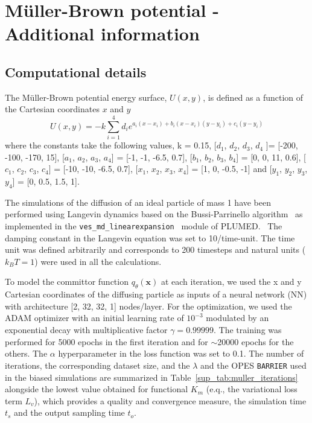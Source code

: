 \clearpage
\section{M\"uller-Brown potential - Additional information}
    \subsection{Computational details}
            The M\"uller-Brown potential energy surface, $U(x, y)$, is defined as a function of the Cartesian coordinates $x$ and $y$ 
                \begin{equation}
                    U(x,y) = -k\sum_{i=1}^4 d_i e^{a_i(x-x_i) + b_i (x-x_i)(y-y_i) + c_i(y-y_i)}
                    \label{seq:muller_formula}
                \end{equation}
            where the constants take the following values, k = 0.15, [$d_1$, $d_2$,  $d_3$,  $d_4$ ]= [-200, -100, -170, 15], [$a_1$, $a_2$,  $a_3$,  $a_4$] = [-1, -1, -6.5, 0.7], [$b_1$, $b_2$,  $b_3$,  $b_4$] = [0, 0, 11, 0.6], [$c_1$, $c_2$,  $c_3$,  $c_4$] = [-10, -10, -6.5, 0.7], [$x_1$, $x_2$,  $x_3$,  $x_4$] = [1, 0, -0.5, -1] and  [$y_1$, $y_2$,  $y_3$,  $y_4$]  = [0, 0.5, 1.5, 1].
            
            The simulations of the diffusion of an ideal particle of mass 1 have been performed using Langevin dynamics based on the Bussi-Parrinello algorithm~\cite{bussi2007accurate} as implemented in the \texttt{ves\_md\_linearexpansion}~\cite{valsson2014variational} module of PLUMED.~\cite{tribello2014plumed, plumed2019promoting}
            The damping constant in the Langevin equation was set to  10/time-unit. 
            The time unit was defined arbitrarily and corresponds to 200 timesteps and natural units ($k_BT = 1$) were used in all the calculations.

            To model the committor function $q_\theta(\textbf{x})$ at each iteration, we used the x and y Cartesian coordinates of the diffusing particle as inputs of a neural network (NN) with architecture [2, 32, 32, 1] nodes/layer.
            For the optimization, we used the ADAM optimizer with an initial learning rate of $10^{-3}$ modulated by an exponential decay with multiplicative factor $\gamma=0.99999$. The training was performed for 5000 epochs in the first iteration and for $\sim$20000 epochs for the others. 
            The $\alpha$ hyperparameter in the loss function was set to 0.1.
            The number of iterations, the corresponding dataset size, and the $\lambda$ and the OPES \texttt{BARRIER} used in the biased simulations are summarized in Table~\ref{sup_tab:muller_iterations} alongside the lowest value obtained for functional $K_m$ (e.q., the variational loss term $L_v$), which provides a quality and convergence measure, the simulation time $t_s$ and the output sampling time $t_o$. 

